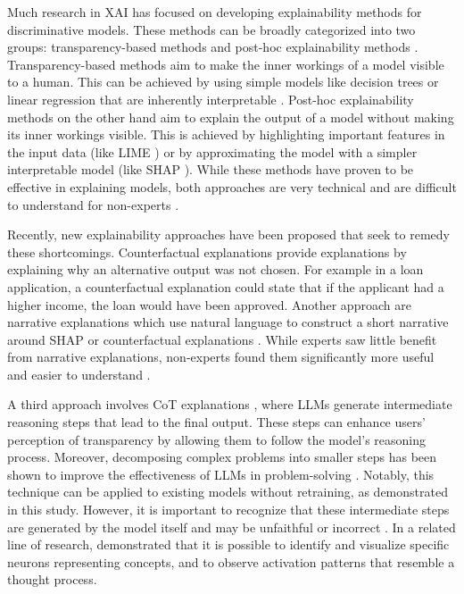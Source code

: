 Much research in \ac{XAI} has focused on developing explainability methods for discriminative models. These methods can be broadly categorized into two groups: transparency-based methods and post-hoc explainability methods \parencite{Arrieta2020}. Transparency-based methods aim to make the inner workings of a model visible to a human. This can be achieved by using simple models like decision trees or linear regression that are inherently interpretable \parencite{Rudin2019}. Post-hoc explainability methods on the other hand aim to explain the output of a model without making its inner workings visible. This is achieved by highlighting important features in the input data (like LIME \parencite{Ribeiro2016}) or by approximating the model with a simpler interpretable model (like SHAP \parencite{Lundberg2017}). While these methods have proven to be effective in explaining models, both approaches are very technical and are difficult to understand for non-experts \parencite{Martens2025}.

Recently, new explainability approaches have been proposed that seek to remedy these shortcomings. Counterfactual explanations \parencite{Wachter2017} provide explanations by explaining why an alternative output was not chosen. For example in a loan application, a counterfactual explanation could state that if the applicant had a higher income, the loan would have been approved. Another approach are narrative explanations which use natural language to construct a short narrative around SHAP or counterfactual explanations \parencite{Martens2025}. While experts saw little benefit from narrative explanations, non-experts found them significantly more useful and easier to understand \parencite{Martens2025}.

A third approach involves \ac{CoT} explanations \parencite{Wei2022}, where \acp{LLM} generate intermediate reasoning steps that lead to the final output. These steps can enhance users' perception of transparency by allowing them to follow the model's reasoning process. Moreover, decomposing complex problems into smaller steps has been shown to improve the effectiveness of \acp{LLM} in problem-solving \parencite{Wei2022}. Notably, this technique can be applied to existing models without retraining, as demonstrated in this study. However, it is important to recognize that these intermediate steps are generated by the model itself and may be unfaithful or incorrect \parencite{Turpin2023, Schneider2024}. In a related line of research, \textcite{Lindsey2025} demonstrated that it is possible to identify and visualize specific neurons representing concepts, and to observe activation patterns that resemble a thought process.


